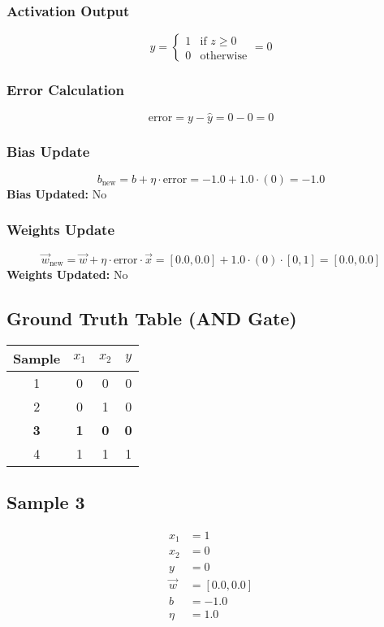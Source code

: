\documentclass{article}
\begin{document}
\subsubsection*{Activation Output}
\[
\hat{y} =
\begin{cases}
1 & \text{if } z \geq 0 \\
0 & \text{otherwise}
\end{cases}
= 0
\]

\subsubsection*{Error Calculation}
\[
\text{error} = y - \hat{y} = 0 - 0 = 0
\]

\subsubsection*{Bias Update}
\[
b_{\text{new}} = b + \eta \cdot \text{error} = -1.0 + 1.0 \cdot (0) = -1.0
\]
\textbf{Bias Updated:} No

\subsubsection*{Weights Update}
\[
\vec{w}_{\text{new}} = \vec{w} + \eta \cdot \text{error} \cdot \vec{x} = 
[0.0, 0.0] + 1.0 \cdot (0) \cdot [0, 1] = 
[0.0, 0.0]
\]
\textbf{Weights Updated:} No

\subsection*{Ground Truth Table (AND Gate)}
\begin{center}
\begin{tabular}{|c|c|c|c|}
\hline
\textbf{Sample} & $x_1$ & $x_2$ & $y$ \\
\hline
1 & 0 & 0 & 0 \\
\hline
2 & 0 & 1 & 0 \\
\hline
\rowcolor{yellow} \textbf{3} & \textbf{1} & \textbf{0} & \textbf{0} \\
\hline
4 & 1 & 1 & 1 \\
\hline
\end{tabular}
\end{center}

\subsection*{Sample 3}
\begin{align*}
x_1 &= 1 \\
x_2 &= 0 \\
y &= 0 \\
\vec{w} &= [0.0, 0.0] \\
b &= -1.0 \\
\eta &= 1.0
\end{align*}
\end{document}
